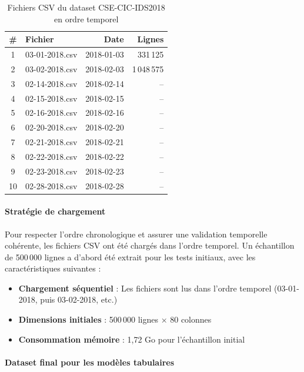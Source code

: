 ﻿\documentclass[11pt,a4paper]{article}
\begin{document}
\begin{table}[htbp]
\centering
\caption{Fichiers CSV du dataset CSE-CIC-IDS2018 en ordre temporel}
\label{tab:csv_files}
\small
\begin{tabular}{clrr}
\toprule
\textbf{\#} & \textbf{Fichier} & \textbf{Date} & \textbf{Lignes} \\
\midrule
1 & 03-01-2018.csv & 2018-01-03 & 331\,125 \\
2 & 03-02-2018.csv & 2018-02-03 & 1\,048\,575 \\
3 & 02-14-2018.csv & 2018-02-14 & -- \\
4 & 02-15-2018.csv & 2018-02-15 & -- \\
5 & 02-16-2018.csv & 2018-02-16 & -- \\
6 & 02-20-2018.csv & 2018-02-20 & -- \\
7 & 02-21-2018.csv & 2018-02-21 & -- \\
8 & 02-22-2018.csv & 2018-02-22 & -- \\
9 & 02-23-2018.csv & 2018-02-23 & -- \\
10 & 02-28-2018.csv & 2018-02-28 & -- \\
\bottomrule
\end{tabular}
\end{table}

\paragraph{Stratégie de chargement}

Pour respecter l'ordre chronologique et assurer une validation temporelle cohérente, les fichiers CSV ont été chargés dans l'ordre temporel. Un échantillon de 500\,000 lignes a d'abord été extrait pour les tests initiaux, avec les caractéristiques suivantes :
\begin{itemize}
    \item \textbf{Chargement séquentiel} : Les fichiers sont lus dans l'ordre temporel (03-01-2018, puis 03-02-2018, etc.)
    \item \textbf{Dimensions initiales} : 500\,000 lignes × 80 colonnes
    \item \textbf{Consommation mémoire} : 1,72 Go pour l'échantillon initial
\end{itemize}

\paragraph{Dataset final pour les modèles tabulaires}
\end{document}
